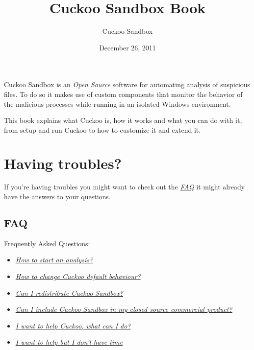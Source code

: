 \documentclass[letterpaper,10pt,english]{sphinxmanual}
\title{Cuckoo Sandbox Book}
\date{December 26, 2011}
\author{Cuckoo Sandbox}
\begin{document}
\maketitle
\tableofcontents
{}\label{index::doc}


Cuckoo Sandbox is an \emph{Open Source} software for automating analysis of suspicious files.
To do so it makes use of custom components that monitor the behavior of the malicious
processes while running in an isolated Windows environment.

This book explains what Cuckoo is, how it works and what you can do with it, from
setup and run Cuckoo to how to customize it and extend it.


\chapter{Having troubles?}
\label{index:index}\label{index:cuckoo-sandbox-book}\label{index:having-troubles}
If you're having troubles you might want to check out the {\hyperref[faq/index::doc]{\emph{FAQ}}}
it might already have the answers to your questions.


\section{FAQ}
\label{faq/index:faq}\label{faq/index::doc}
Frequently Asked Questions:
\begin{itemize}
\item {} 
{\hyperref[faq/index:question-1]{\emph{How to start an analysis?}}}

\item {} 
{\hyperref[faq/index:question-2]{\emph{How to change Cuckoo default behaviour?}}}

\item {} 
{\hyperref[faq/index:question-3]{\emph{Can I redistribute Cuckoo Sandbox?}}}

\item {} 
{\hyperref[faq/index:question-4]{\emph{Can I include Cuckoo Sandbox in my closed source commercial product?}}}

\item {} 
{\hyperref[faq/index:question-5]{\emph{I want to help Cuckoo, what can I do?}}}

\item {} 
{\hyperref[faq/index:question-6]{\emph{I want to help but I don't have time}}}

\end{itemize}
\end{document}

